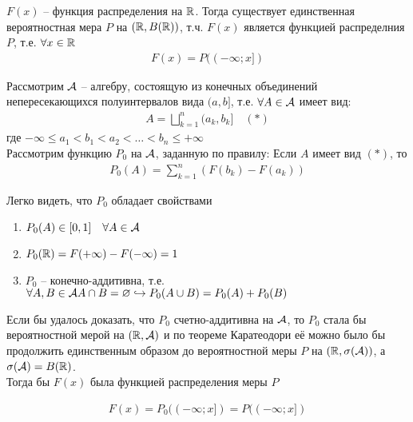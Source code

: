 \begin{theorem}
	$F(x)$ -- функция распределения на $\mathbb{R}$. 
	Тогда существует единственная вероятностная мера $P$ на $(\mathbb{R}, B(\mathbb{R}))$, т.ч. $F(x)$ 
	является функцией распределния $P$, т.е. $\forall x \in \mathbb{R}$
	\begin{align*}
		F(x) = P((-\infty; x])
	\end{align*}
\end{theorem}

Рассмотрим $\mathcal{A}$ -- алгебру, состоящую из конечных объединений непересекающихся полуинтервалов вида $(a, b]$, т.е. $\forall A \in \mathcal{A}$ имеет вид:
\begin{align*}
	A = \bigsqcup_{k = 1}^{n} (a_k, b_k] \quad (*)
\end{align*}
где $-\infty \leq a_1 < b_1 < a_2 < \ldots < b_n \leq +\infty$\\

Рассмотрим функцию $P_0$ на $\mathcal{A}$, заданную по правилу: Если $A$ имеет вид $(*)$, то
\begin{align*}
	P_0 (A) = \sum_{k = 1}^{n} (F(b_k) - F(a_k))
\end{align*}

Легко видеть, что $P_0$ обладает свойствами 
\begin{enumerate}
	\item $P_0(A) \in [0, 1]\quad \forall A \in \mathcal{A}$
	\item $P_0(\mathbb{R}) = F(+\infty) - F(-\infty) = 1$
	\item 
		$P_0$ -- конечно-аддитивна, т.е. 
		$\forall A, B \in \mathcal{A}\\
		 A \cap B = \varnothing \hookrightarrow P_0 (A \cup B) = P_0(A) + P_0(B)$
\end{enumerate}

Если бы удалось доказать, что $P_0$  счетно-аддитивна на $\mathcal{A}$, 
то $P_0$ стала бы вероятностной мерой на $(\mathbb{R}, \mathcal{A})$ и по теореме Каратеодори
 её можно было бы продолжить единственным образом до вероятностной меры $P$ 
 на $(\mathbb{R}, \sigma(\mathcal{A}))$, а $\sigma(\mathcal{A}) = B(\mathbb{R})$.\\

Тогда бы $F(x)$ была функцией распределения меры $P$

\begin{align*}
	F(x) = P_0 ((-\infty; x]) = P((-\infty; x])
\end{align*}

